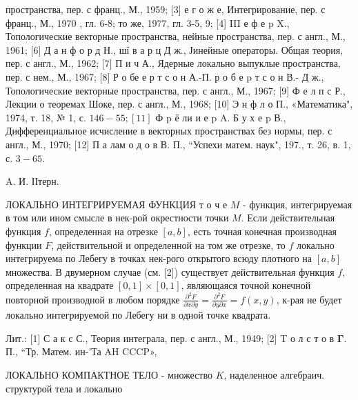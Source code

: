 \documentclass[10pt]{article}
\begin{document}
пространства, пер. с франц., М., 1959; [3] е г о ж е, Интегрирование, пер. с франц., М., 1970 , гл. 6-8; то же, 1977, гл. 3-5, 9; [4] III е ф е p X., Топологические векторные пространства, нейные пространства, пер. с англ., М., 1961; [6] Д а н ф о р д Н., шї в а р ц Д ж., Јинейные операторы. Общая теория, пер. с англ., М., 1962; [7] П и ч А., Ядерные локально выпуклые пространства, пер. с нем., М., 1967; [8] Р о бе е р т с о н А.-П. р о б е p т с о н В.- Д ж., Топологические векторные пространства, пер. с англ., М., 1967; [9] Ф е л п с Р., Лекции о теоремах Шоке, пер. с англ., М., 1968; [10] Э н ф л о П., «Математика", 1974, т. 18, № 1, с. $146-55 ;[11]$ Ф p ё ли и е p A. Б у х е p В., Дифференциальное исчисление в векторных пространствах без нормы, пер. с англ., М., 1970; [12] П а лам о д о в В. П., “Успехи матем. наук", 197., т. 26, в. 1, с. $3-65$.

A. И. ІІтерн.



ЛОКАЛЬНО ИНТЕГРИРУЕМАЯ ФУНКЦИЯ т о ч е $M$ - функция, интегрируемая в том или ином смысле в нек-рой окрестности точки $M$. Если действительная функция $f$, определенная на отрезке $[a, b]$, есть точная конечная производная функции $F$, действительной и определенной на том же отрезке, то $f$ локально интегрируема по Лебегу в точках нек-рого открытого всюду плотного на $[a, b]$ множества. В двумерном случае (см. [2]) существует действительная функция $f$, определенная на квадрате $[0,1] \times[0,1]$, являющаяся точной конечной повторной производной в любом порядке $\frac{\partial^{2} F}{\partial x \partial y}=\frac{\partial^{2} F}{\partial y \partial x}=f(x, y)$, к-рая не будет локально интегрируемой по Лебегу ни в одной точке квадрата.



Лит.: [1] С а к с С., Теория интеграла, пер. с англ., М., 1949; [2] T о л с т о в $\boldsymbol{\Gamma}$. П., “Тр. Матем. ин-'Та AH CCCP»,



ЛОКАЛЬНО КОМПАКТНОЕ ТЕЛО - множество $K$, наделенное алгебраич. структурой тела и локально
\end{document}
